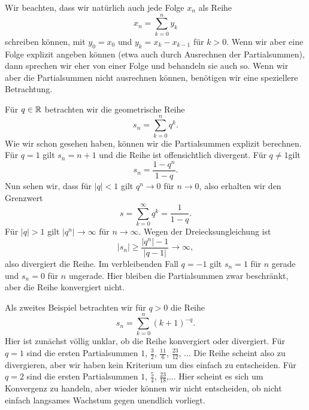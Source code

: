 Wir beachten, dass wir natürlich auch jede Folge \(x_n\) als Reihe
\begin{equation*}
 x_n =\sum_{k=0}^n y_k
\end{equation*}
schreiben können, mit \(y_0=x_0\) und \(y_k = x_k - x_{k-1}\) für \(k > 0\). Wenn wir aber eine Folge explizit angeben können (etwa auch durch Ausrechnen der Partialsummen), dann sprechen wir eher von einer Folge und behandeln sie auch so. Wenn wir aber die Partialsummen nicht ausrechnen können, benötigen wir eine speziellere Betrachtung.
\label{metrik/reihen:example-1}
\begin{example}{}{}



Für \(q \in \mathbb{R}\) betrachten wir die geometrische Reihe
\begin{equation*}
 s_n = \sum_{k=0}^n q^k.
\end{equation*}
Wie wir schon gesehen haben, können wir die Partialsummen explizit berechnen. Für \(q=1\) gilt \(s_n = n+1\) und die Reihe ist offensichtlich divergent. Für \(q\neq 1 \)gilt
\begin{equation*}
 s_n = \frac{1-q^n}{1-q}.
\end{equation*}
Nun sehen wir, dass für \(|q| <1\) gilt \(q^n \rightarrow 0\) für \(n \rightarrow 0\), also erhalten wir den Grenzwert
\begin{equation*}
 s  = \sum_{k=0}^\infty q^k = \frac{1}{1-q}.
\end{equation*}
Für \(|q|>1\) gilt \(|q^n| \rightarrow \infty\) für \(n \rightarrow \infty\). Wegen der Dreiecksungleichung ist
\begin{equation*}
 |s_n| \geq \frac{|q^n|-1}{|q-1|} \rightarrow \infty,
\end{equation*}
also divergiert die Reihe.
Im verbleibenden Fall \(q=-1\) gilt \(s_n=1\) für \(n\) gerade und \(s_n=0\) für \(n\) ungerade. Hier bleiben die Partialsummen zwar beschränkt, aber die Reihe konvergiert nicht.
\end{example}
\label{metrik/reihen:example-2}
\begin{example}{}{}



Als zweites Beispiel betrachten wir für \(q > 0\) die Reihe
\begin{equation*}
 s_n = \sum_{k=0}^n (k+1)^{-q}.
\end{equation*}
Hier ist zunächst völlig unklar, ob die Reihe konvergiert oder divergiert. Für \(q=1\) sind die ersten Partialsummen \(1\), \(\frac{3}2\), \(\frac{11}6\), \(\frac{23}{12}\), \(\ldots\) Die Reihe scheint also zu divergieren, aber wir haben kein Kriterium um dies einfach zu entscheiden. Für \(q=2\) sind die ersten Partialsummen \(1\), \(\frac{5}4\), \(\frac{23}{18}\),\(\ldots\) Hier scheint es sich um Konvergenz zu handeln, aber wieder können wir nicht entscheiden, ob nicht einfach langsames Wachstum gegen unendlich vorliegt.
\end{example}


